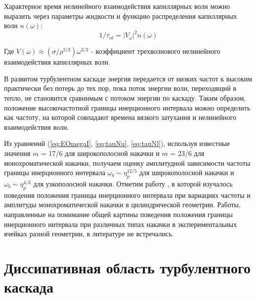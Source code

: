 Характерное время нелинейного взаимодействия капиллярных волн можно выразить через параметры жидкости и функцию распределения капиллярных волн $n(\omega)$:
\begin{equation}
\label{eq:tauNl}
1/\tau_{nl} = |V_\omega|^2 n(\omega)
\end{equation}

Где $V(\omega) \approx (\sigma/\rho^{3/2})\omega^{3/2}$ - коэффициент трехволнового нелинейного взаимодействия капиллярных волн.

В развитом турбулентном каскаде энергия передается от низких частот к высоким практически без потерь до тех пор, пока поток энергии волн, переходящий в тепло, не становится сравнимым с потоком энергии по каскаду. Таким образом, положение высокочастотной границы инерционного интервала можно определить как частоту, на которой совпадают времена вязкого затухания и нелинейного взаимодействия волн.

Из уравнений (\ref{eq:EOmegaI}, \ref{eq:tauNu}, \ref{eq:tauNl}), используя известные значения $m$ = 17/6 для широкополосной накачки и $m$ = 23/6 для монохроматической накачки, получаем оценку амплитудной зависимости частоты границы инерционного интервала $\omega_b \sim \eta_p^{12/5}$ для широкополосной накачки и $\omega_b \sim \eta_p^{4/3}$ для узкополосной накачки. Отметим работу \cite{Brazhnikov_bound_freq}, в которой изучалось поведения положения границы инерционного интервала при вариациях частоты и амплитуды монохроматической накачки в цилиндрической геометрии. Работы, направленные на понимание общей картины поведения положения границы инерционного интервала при различных типах накачки в экспериментальных ячейках разной геометрии, в литературе не встречались.

\section{Диссипативная область турбулентного каскада}%


